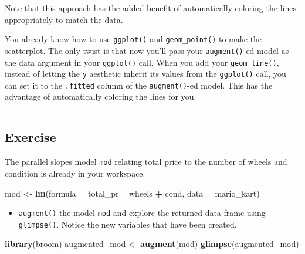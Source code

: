 \documentclass[
]{book}
\newenvironment{Shaded}{\begin{snugshade}}{\end{snugshade}}
\newcommand{\DataTypeTok}[1]{\textcolor[rgb]{0.13,0.29,0.53}{#1}}
\newcommand{\KeywordTok}[1]{\textcolor[rgb]{0.13,0.29,0.53}{\textbf{#1}}}
\newcommand{\NormalTok}[1]{#1}
\newcommand{\OperatorTok}[1]{\textcolor[rgb]{0.81,0.36,0.00}{\textbf{#1}}}
\newcommand{\StringTok}[1]{\textcolor[rgb]{0.31,0.60,0.02}{#1}}
\providecommand{\tightlist}{%
  \setlength{\itemsep}{0pt}\setlength{\parskip}{0pt}}
\begin{document}
Note that this approach has the added benefit of automatically coloring the lines appropriately to match the data.

You already know how to use \texttt{ggplot()} and \texttt{geom\_point()} to make the scatterplot. The only twist is that now you'll pass your \texttt{augment()}-ed model as the data argument in your \texttt{ggplot()} call. When you add your \texttt{geom\_line()}, instead of letting the \texttt{y} aesthetic inherit its values from the \texttt{ggplot()} call, you can set it to the \texttt{.fitted} column of the \texttt{augment()}-ed model. This has the advantage of automatically coloring the lines for you.

\begin{center}\rule{0.5\linewidth}{0.5pt}\end{center}

\hypertarget{exercise-1}{%
\subsection*{Exercise}\label{exercise-1}}

The parallel slopes model \texttt{mod} relating total price to the number of wheels and condition is already in your workspace.

\begin{Shaded}
\begin{Highlighting}[]
\NormalTok{mod <-}\StringTok{ }\KeywordTok{lm}\NormalTok{(}\DataTypeTok{formula =}\NormalTok{ total_pr }\OperatorTok{~}\StringTok{ }\NormalTok{wheels }\OperatorTok{+}\StringTok{ }\NormalTok{cond, }\DataTypeTok{data =}\NormalTok{ mario_kart)}
\end{Highlighting}
\end{Shaded}

\begin{itemize}
\tightlist
\item
  \texttt{augment()} the model \texttt{mod} and explore the returned data frame using \texttt{glimpse()}. Notice the new variables that have been created.
\end{itemize}

\begin{Shaded}
\begin{Highlighting}[]
\KeywordTok{library}\NormalTok{(broom)}
\NormalTok{augmented_mod <-}\StringTok{ }\KeywordTok{augment}\NormalTok{(mod)}
\KeywordTok{glimpse}\NormalTok{(augmented_mod)}
\end{Highlighting}
\end{Shaded}
\end{document}
